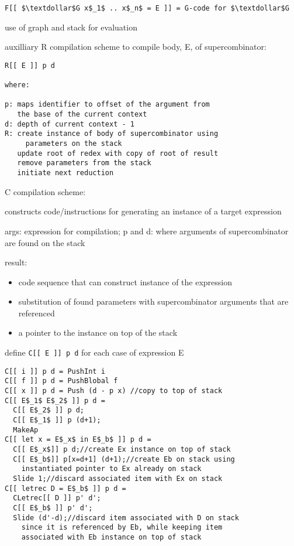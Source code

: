 \documentclass[8pt]{extarticle}
\begin{document}
\begin{multicols*}{2}
\begin{lstlisting}
F[[ $\textdollar$G x$_1$ .. x$_n$ = E ]] = G-code for $\textdollar$G
\end{lstlisting}

use of graph and stack for evaluation

auxilliary R compilation scheme to compile body, E, of supercombinator:
\begin{lstlisting}
R[[ E ]] p d

where:

p: maps identifier to offset of the argument from
   the base of the current context
d: depth of current context - 1
R: create instance of body of supercombinator using
     parameters on the stack
   update root of redex with copy of root of result
   remove parameters from the stack
   initiate next reduction
\end{lstlisting}

C compilation scheme:

constructs code/instructions for generating an instance of a target expression

args: expression for compilation; p and d: where arguments of supercombinator are found on the stack

result:
\begin{itemize}
\item code sequence that can construct instance of the expression
\item substitution of found parameters with supercombinator arguments that are referenced
\item a pointer to the instance on top of the stack
\end{itemize}

define \verb|C[[ E ]] p d| for each case of expression E

\begin{lstlisting}
C[[ i ]] p d = PushInt i
C[[ f ]] p d = PushBlobal f
C[[ x ]] p d = Push (d - p x) //copy to top of stack
C[[ E$_1$ E$_2$ ]] p d =
  C[[ E$_2$ ]] p d;
  C[[ E$_1$ ]] p (d+1);
  MakeAp
C[[ let x = E$_x$ in E$_b$ ]] p d =
  C[[ E$_x$]] p d;//create Ex instance on top of stack
  C[[ E$_b$]] p[x=d+1] (d+1);//create Eb on stack using
    instantiated pointer to Ex already on stack
  Slide 1;//discard associated item with Ex on stack
C[[ letrec D = E$_b$ ]] p d =
  CLetrec[[ D ]] p' d';
  C[[ E$_b$ ]] p' d';
  Slide (d'-d);//discard item associated with D on stack
    since it is referenced by Eb, while keeping item
    associated with Eb instance on top of stack


\end{lstlisting}
\end{multicols*}
\end{document}
